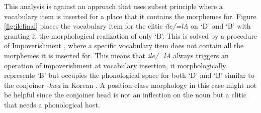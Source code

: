 This analysis is against an approach that uses subset principle where a vocabulary item is inserted for a place that it contains the morphemes for. Figure \ref{fig:ilefinal} places the vocabulary item for the clitic \textit{ile/=lA} on `D' and `B' with granting it the morphological realization of only `B'. This is solved by a procedure of Impoverishment \citep{bonet1991morphology}, where a specific vocabulary item does not contain all the morphemes it is inserted for. This means that \textit{ile/=lA} always triggers an operation of impoverishment at vocabulary insertion, it morphologically represents `B' but occupies the phonological space for both `D' and `B' similar to the conjoiner \textit{-kwa} in Korean \citep{yoon2005conjunction}. A position class morphology \citep{inkelas1993nimboran,stump1993position} in this case might not be helpful since the conjoiner head is not an inflection on the noun but a clitic that needs a phonological host.